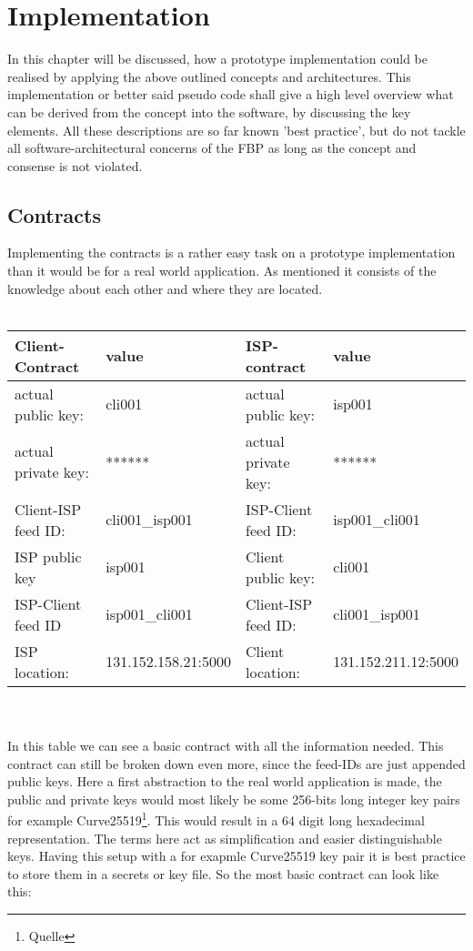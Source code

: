 \chapter{Implementation}
In this chapter will be discussed, how a prototype implementation could be realised by applying the above outlined concepts and architectures. This implementation or better said pseudo code shall give a high level overview what can be derived from the concept into the software, by discussing the key elements. All these descriptions are so far known 'best practice', but do not tackle all software-architectural concerns of the FBP as long as the concept and consense is not violated.
\section{Contracts}
Implementing the contracts is a rather easy task on a prototype implementation than it would be for a real world application. As mentioned it consists of the knowledge about each other and where they are located. 
\\\\
\begin{tabular}{llll} \toprule
    Client-Contract&value&ISP-contract&value\\ \midrule
    actual public key:& cli001 &  actual public key: &isp001  \\ 
    actual private key:& ****** & actual private key:& ****** \\
    Client-ISP feed ID:& cli001\_isp001 &ISP-Client feed ID:&isp001\_cli001 \\ 
    ISP public key&isp001&Client public key:&cli001\\
    ISP-Client feed ID&isp001\_cli001&Client-ISP feed ID:&cli001\_isp001\\
    ISP location:&131.152.158.21:5000 &Client location:& 131.152.211.12:5000 \\\bottomrule
\end{tabular}
\\
\\
In this table we can see a basic contract with all the information needed. This contract can still be broken down even more, since the feed-IDs are just appended public keys. Here a first abstraction to the real world application is made, the public and private keys would most likely be some 256-bits long integer key pairs for example Curve25519\footnote{Quelle}. This would result in a 64 digit long hexadecimal representation. The terms here act as simplification and easier distinguishable keys. Having this setup with a for exapmle Curve25519 key pair it is best practice to store them in a secrets or key file. So the most basic contract can look like this:
